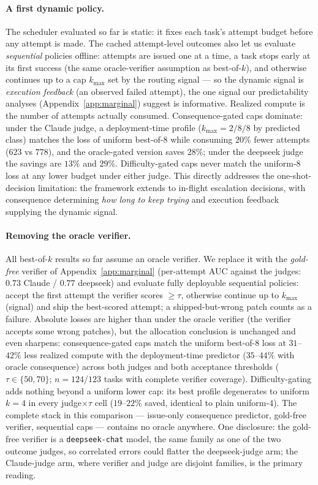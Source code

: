 \documentclass{article}
\begin{document}
\paragraph{A first dynamic policy.} The scheduler evaluated so far is
static: it fixes each task's attempt budget before any attempt is
made. The cached attempt-level outcomes also let us evaluate
\emph{sequential} policies offline: attempts are issued one at a
time, a task stops early at its first success (the same
oracle-verifier assumption as best-of-$k$), and otherwise continues
up to a cap $k_{\max}$ set by the routing signal --- so the dynamic
signal is \emph{execution feedback} (an observed failed attempt), the
one signal our predictability analyses (Appendix~\ref{app:marginal})
suggest is informative. Realized compute is the number of attempts
actually consumed. Consequence-gated caps dominate: under the Claude
judge, a deployment-time profile ($k_{\max} = 2/8/8$ by predicted
class) matches the loss of uniform best-of-$8$ while consuming
$20\%$ fewer attempts ($623$ vs $778$), and the oracle-gated version
saves $28\%$; under the deepseek judge the savings are $13\%$ and
$29\%$. Difficulty-gated caps never match the uniform-$8$ loss at
any lower budget under either judge. This directly addresses the
one-shot-decision limitation: the framework extends to in-flight
escalation decisions, with consequence determining \emph{how long to
keep trying} and execution feedback supplying the dynamic signal.

\paragraph{Removing the oracle verifier.} All best-of-$k$ results so
far assume an oracle verifier. We replace it with the \emph{gold-free}
verifier of Appendix~\ref{app:marginal} (per-attempt AUC against the
judges: $0.73$ Claude / $0.77$ deepseek) and evaluate fully
deployable sequential policies: accept the first attempt the verifier
scores $\ge \tau$, otherwise continue up to $k_{\max}$(signal) and
ship the best-scored attempt; a shipped-but-wrong patch counts as a
failure. Absolute losses are higher than under the oracle verifier
(the verifier accepts some wrong patches), but the allocation
conclusion is unchanged and even sharpens: consequence-gated caps
match the uniform best-of-$8$ loss at $31$--$42\%$ less realized
compute with the deployment-time predictor ($35$--$44\%$ with oracle
consequence) across both judges and both acceptance thresholds
($\tau \in \{50, 70\}$; $n = 124$/$123$ tasks with complete verifier
coverage). Difficulty-gating adds nothing beyond a uniform lower
cap: its best profile degenerates to uniform $k{=}4$ in every
judge$\times\tau$ cell ($19$--$22\%$ saved, identical to plain
uniform-$4$). The complete stack in this comparison ---
issue-only consequence predictor, gold-free verifier, sequential
caps --- contains no oracle anywhere. One disclosure: the gold-free
verifier is a \texttt{deepseek-chat} model, the same family as one
of the two outcome judges, so correlated errors could flatter the
deepseek-judge arm; the Claude-judge arm, where verifier and judge
are disjoint families, is the primary reading.
\end{document}
